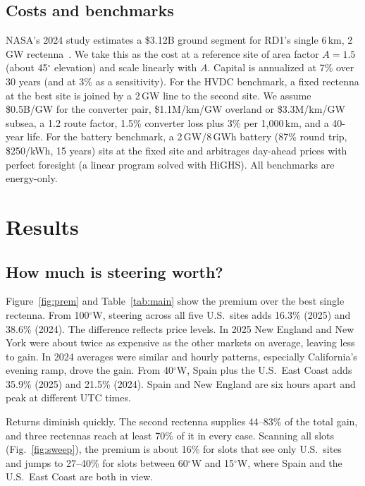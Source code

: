 \documentclass[11pt]{article}
\begin{document}
\subsection{Costs and benchmarks}
NASA's 2024 study estimates a \$3.12B ground segment for RD1's single 6\,km, 2\,GW rectenna~\cite{nasa2024}. We take
this as the cost at a reference site of area factor $A=1.5$ (about 45$^\circ$ elevation) and scale linearly with $A$.
Capital is annualized at 7\% over 30 years (and at 3\% as a sensitivity). For the HVDC benchmark, a fixed rectenna
at the best site is joined by a 2\,GW line to the second site. We assume \$0.5B/GW for the converter pair, \$1.1M/km/GW
overland or \$3.3M/km/GW subsea, a 1.2 route factor, 1.5\% converter loss plus 3\% per 1,000\,km, and a 40-year life.
For the battery benchmark, a 2\,GW/8\,GWh battery (87\% round trip, \$250/kWh, 15 years) sits at the fixed site and
arbitrages day-ahead prices with perfect foresight (a linear program solved with HiGHS). All benchmarks are energy-only.

\section{Results}
\subsection{How much is steering worth?}
Figure~\ref{fig:prem} and Table~\ref{tab:main} show the premium over the best single rectenna. From 100$^\circ$W, steering
across all five U.S.\ sites adds 16.3\% (2025) and 38.6\% (2024). The difference reflects price levels. In 2025 New England
and New York were about twice as expensive as the other markets on average, leaving less to gain. In 2024 averages were
similar and hourly patterns, especially California's evening ramp, drove the gain. From 40$^\circ$W, Spain plus the U.S.\
East Coast adds 35.9\% (2025) and 21.5\% (2024). Spain and New England are six hours apart and peak at different
UTC times.

Returns diminish quickly. The second rectenna supplies 44--83\% of the total gain, and three rectennas reach at least 70\%
of it in every case. Scanning all slots (Fig.~\ref{fig:sweep}), the premium is about 16\% for slots that see only U.S.\ sites and jumps to
27--40\% for slots between 60$^\circ$W and 15$^\circ$W, where Spain and the U.S.\ East Coast are both in view.
\end{document}
